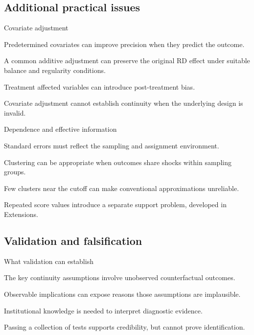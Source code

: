 \subsection{Additional practical issues}
\begin{frame}{Covariate adjustment}
\begin{items}
\item Predetermined covariates can improve precision when they predict the outcome.
\item A common additive adjustment can preserve the original RD effect under suitable balance and regularity conditions.
\item Treatment affected variables can introduce post-treatment bias.
\item Covariate adjustment cannot establish continuity when the underlying design is invalid.
\end{items}
\end{frame}

\begin{frame}{Dependence and effective information}
\begin{items}
\item Standard errors must reflect the sampling and assignment environment.
\item Clustering can be appropriate when outcomes share shocks within sampling groups.
\item Few clusters near the cutoff can make conventional approximations unreliable.
\item Repeated score values introduce a separate support problem, developed in Extensions.
\end{items}
\end{frame}

\subsection{Validation and falsification}
\begin{frame}{What validation can establish}
\begin{items}
\item The key continuity assumptions involve unobserved counterfactual outcomes.
\item Observable implications can expose reasons those assumptions are implausible.
\item Institutional knowledge is needed to interpret diagnostic evidence.
\item Passing a collection of tests supports credibility, but cannot prove identification.
\end{items}
\end{frame}

